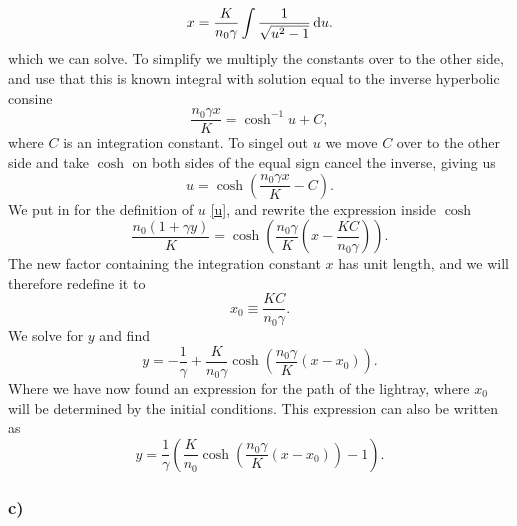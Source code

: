 \documentclass[12pt,twoside]{article}
\begin{document}
\begin{equation}
   x = \frac{K}{n_0\gamma}\int \frac{1}{\sqrt{u^2-1}} \dif u.
\end{equation}
which we can solve. To simplify we multiply the constants over to the other side, and use that this is known integral with solution equal to the inverse hyperbolic consine
\begin{equation}
   \frac{n_0\gamma x}{K} = \cosh^{-1}{u} + C,
\end{equation}
where $C$ is an integration constant. To singel out $u$ we move $C$ over to the other side and take $\cosh{}$ on both sides of the equal sign cancel the inverse, giving us
\begin{equation}
   u = \cosh{\left(\frac{n_0\gamma x}{K}-C\right)}.
\end{equation}
We put in for the definition of $u$ \eqref{u}, and rewrite the expression inside $\cosh{}$
\begin{equation}
   \frac{n_0\left(1+\gamma y\right)}{K} = \cosh{\left(\frac{n_0\gamma}{K}\left(x-\frac{KC}{n_0\gamma}\right)\right)}.
\end{equation}
The new factor containing the integration constant $x$ has unit length, and we will therefore redefine it to
\begin{equation}
  x_0 \equiv \frac{KC}{n_0\gamma} .
\end{equation}
We solve for $y$ and find
\begin{equation}
   y = -\frac{1}{\gamma} + \frac{K}{n_0\gamma}\cosh{\left(\frac{n_0\gamma}{K}\left(x-x_0\right)\right)}.
\end{equation}
Where we have now found an expression for the path of the lightray, where $x_0$ will be determined by the initial conditions. This expression can also be written as
\begin{equation}
   y = \frac{1}{\gamma}\left(\frac{K}{n_0}\cosh{\left(\frac{n_0\gamma}{K}\left(x-x_0\right)\right)}-1\right).
\end{equation}
\subsubsection*{c)}
%
%
\end{document}
